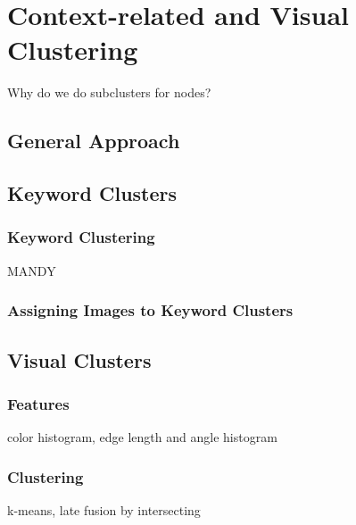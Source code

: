 %
\section{Context-related and Visual Clustering}
\label{sec_inhalt}
Why do we do subclusters for nodes?

\subsection{General Approach}


\subsection{Keyword Clusters}

\subsubsection{Keyword Clustering}
MANDY
\subsubsection{Assigning Images to Keyword Clusters}


\subsection{Visual Clusters}

\subsubsection{Features}
color  histogram, edge length and angle histogram

\subsubsection{Clustering}
k-means, late fusion by intersecting
